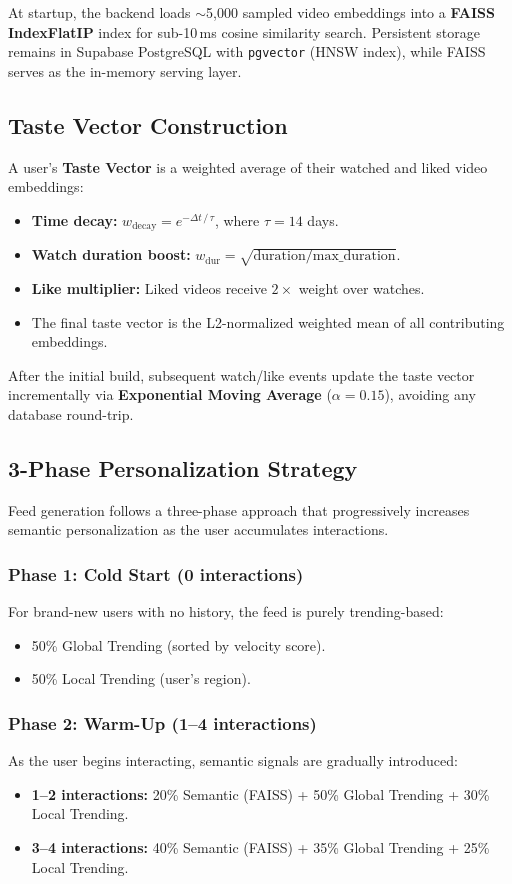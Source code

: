 \documentclass[11pt, a4paper]{report}
\begin{document}
At startup, the backend loads $\sim$5,000 sampled video embeddings into a \textbf{FAISS IndexFlatIP} index for sub-10\,ms cosine similarity search. Persistent storage remains in Supabase PostgreSQL with \texttt{pgvector} (HNSW index), while FAISS serves as the in-memory serving layer.

\subsection{Taste Vector Construction}
A user's \textbf{Taste Vector} is a weighted average of their watched and liked video embeddings:
\begin{itemize}
    \item \textbf{Time decay:} $w_{\text{decay}} = e^{-\Delta t\,/\,\tau}$, where $\tau = 14$ days.
    \item \textbf{Watch duration boost:} $w_{\text{dur}} = \sqrt{\text{duration} / \text{max\_duration}}$.
    \item \textbf{Like multiplier:} Liked videos receive $2\times$ weight over watches.
    \item The final taste vector is the L2-normalized weighted mean of all contributing embeddings.
\end{itemize}
After the initial build, subsequent watch/like events update the taste vector incrementally via \textbf{Exponential Moving Average} ($\alpha = 0.15$), avoiding any database round-trip.

\subsection{3-Phase Personalization Strategy}
Feed generation follows a three-phase approach that progressively increases semantic personalization as the user accumulates interactions.

\subsubsection{Phase 1: Cold Start (0 interactions)}
For brand-new users with no history, the feed is purely trending-based:
\begin{itemize}
    \item 50\% Global Trending (sorted by velocity score).
    \item 50\% Local Trending (user's region).
\end{itemize}

\subsubsection{Phase 2: Warm-Up (1--4 interactions)}
As the user begins interacting, semantic signals are gradually introduced:
\begin{itemize}
    \item \textbf{1--2 interactions:} 20\% Semantic (FAISS) + 50\% Global Trending + 30\% Local Trending.
    \item \textbf{3--4 interactions:} 40\% Semantic (FAISS) + 35\% Global Trending + 25\% Local Trending.
\end{itemize}
\end{document}
